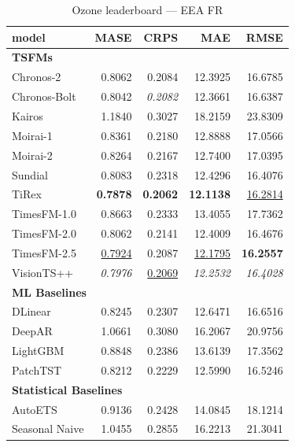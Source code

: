 \begin{table}[H]
\caption{Ozone leaderboard --- EEA FR}
\centering
\begin{small}
\begin{tabular}{lrrrr}
\toprule
model & MASE & CRPS & MAE & RMSE \\
\midrule
\multicolumn{5}{l}{\textbf{TSFMs}} \\
Chronos-2 & 0.8062 & 0.2084 & 12.3925 & 16.6785 \\
Chronos-Bolt & 0.8042 & \textit{0.2082} & 12.3661 & 16.6387 \\
Kairos & 1.1840 & 0.3027 & 18.2159 & 23.8309 \\
Moirai-1 & 0.8361 & 0.2180 & 12.8888 & 17.0566 \\
Moirai-2 & 0.8264 & 0.2167 & 12.7400 & 17.0395 \\
Sundial & 0.8083 & 0.2318 & 12.4296 & 16.4076 \\
TiRex & \textbf{0.7878} & \textbf{0.2062} & \textbf{12.1138} & \underline{16.2814} \\
TimesFM-1.0 & 0.8663 & 0.2333 & 13.4055 & 17.7362 \\
TimesFM-2.0 & 0.8062 & 0.2141 & 12.4009 & 16.4676 \\
TimesFM-2.5 & \underline{0.7924} & 0.2087 & \underline{12.1795} & \textbf{16.2557} \\
VisionTS++ & \textit{0.7976} & \underline{0.2069} & \textit{12.2532} & \textit{16.4028} \\
\midrule
\multicolumn{5}{l}{\textbf{ML Baselines}} \\
DLinear & 0.8245 & 0.2307 & 12.6471 & 16.6516 \\
DeepAR & 1.0661 & 0.3080 & 16.2067 & 20.9756 \\
LightGBM & 0.8848 & 0.2386 & 13.6139 & 17.3562 \\
PatchTST & 0.8212 & 0.2229 & 12.5990 & 16.5246 \\
\midrule
\multicolumn{5}{l}{\textbf{Statistical Baselines}} \\
AutoETS & 0.9136 & 0.2428 & 14.0845 & 18.1214 \\
Seasonal Naive & 1.0455 & 0.2855 & 16.2213 & 21.3041 \\
\bottomrule
\end{tabular}
\end{small}
\end{table}